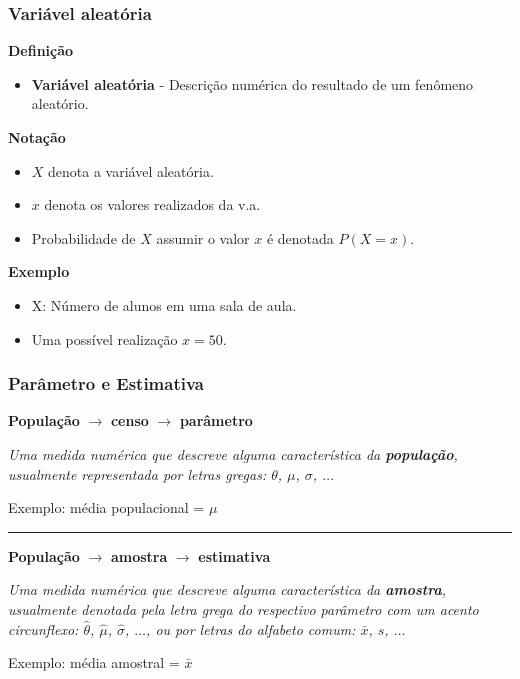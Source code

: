 \documentclass[11pt]{beamer}
\begin{document}
\begin{frame}
\frametitle{Variável aleatória}

\textbf{Definição}

\begin{itemize}
\item
  \textbf{Variável aleatória} - Descrição numérica do resultado de um
  fenômeno aleatório.
\end{itemize}

\textbf{Notação}

\begin{itemize}
\item
  \(X\) denota a variável aleatória.
\item
  \(x\) denota os valores realizados da v.a.
\item
  Probabilidade de \(X\) assumir o valor \(x\) é denotada \(P(X = x)\).
\end{itemize}

\textbf{Exemplo}

\begin{itemize}
\item
  X: Número de alunos em uma sala de aula.
\item
  Uma possível realização \(x = 50\).
\end{itemize}
\end{frame}

\begin{frame}
\frametitle{Parâmetro e Estimativa}

\textbf{População} \(\rightarrow\) \textbf{censo} \(\rightarrow\)
\textbf{parâmetro}

\emph{Uma medida numérica que descreve alguma característica da
\textbf{população}, usualmente representada por letras gregas:
\(\theta\), \(\mu\), \(\sigma\), \(\ldots\)}

Exemplo: média populacional = \(\mu\)

\vspace{1em}
\hrule
\vspace{1em}

\textbf{População} \(\rightarrow\) \textbf{amostra} \(\rightarrow\)
\textbf{estimativa}

\emph{Uma medida numérica que descreve alguma característica da
\textbf{amostra}, usualmente denotada pela letra grega do respectivo
parâmetro com um acento circunflexo: \(\hat\theta\), \(\hat\mu\),
\(\hat\sigma\), \(\ldots\), ou por letras do alfabeto comum: \(\bar x\),
\(s\), \(\ldots\)}

Exemplo: média amostral = \(\bar{x}\)
\end{frame}
\end{document}
